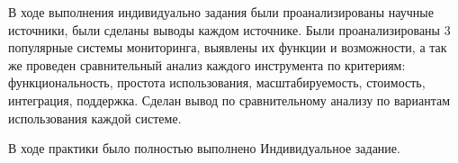 
В ходе выполнения индивидуально задания были проанализированы научные источники, были сделаны выводы
каждом источнике. Были проанализированы 3 популярные системы мониторинга, выявлены их функции и возможности,
а так же проведен сравнительный анализ каждого инструмента по критериям: 
функциональность, простота использования,
масштабируемость,
стоимость,
интеграция,
поддержка. Сделан вывод по сравнительному анализу по вариантам использования каждой системе.

В ходе практики было полностью выполнено Индивидуальное задание.

\clearpage